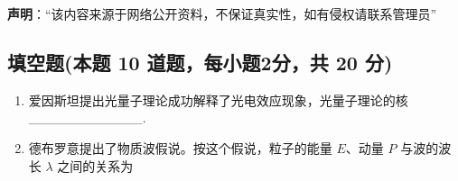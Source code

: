 
\textbf{声明}：“该内容来源于网络公开资料，不保证真实性，如有侵权请联系管理员”

\subsection{填空题(本题 10 道题，每小题2分，共 20 分)}
\begin{enumerate}
\item 爱因斯坦提出光量子理论成功解释了光电效应现象，光量子理论的核____________.
\item 德布罗意提出了物质波假说。按这个假说，粒子的能量 $E$、动量 $P$ 与波的波长 $\lambda$ 之间的关系为
\end{enumerate}
